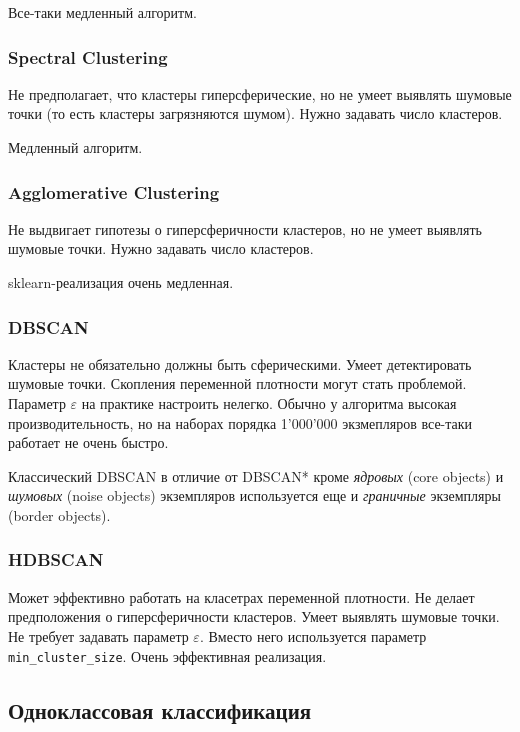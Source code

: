 \documentclass[%
	11pt,
	a4paper,
	utf8,
		]{article}
\begin{document}
Все-таки медленный алгоритм.

\subsubsection{Spectral Clustering}

Не предполагает, что кластеры гиперсферические, но не умеет выявлять шумовые точки (то есть кластеры загрязняются шумом). Нужно задавать число кластеров.

Медленный алгоритм.

\subsubsection{Agglomerative Clustering}

Не выдвигает гипотезы о гиперсферичности кластеров, но не умеет выявлять шумовые точки. Нужно задавать число кластеров.

sklearn-реализация очень медленная.

\subsubsection{DBSCAN}

Кластеры не обязательно должны быть сферическими. Умеет детектировать шумовые точки. Скопления переменной плотности могут стать проблемой. Параметр $ \varepsilon $ на практике настроить нелегко. Обычно у алгоритма высокая производительность, но на наборах порядка 1'000'000 экзмепляров все-таки работает не очень быстро.

Классический DBSCAN в отличие от DBSCAN* кроме \emph{ядровых} (core objects) и \emph{шумовых} (noise objects) экземпляров используется еще и \emph{граничные} экземпляры (border objects).

\subsubsection{HDBSCAN}

Может эффективно работать на класетрах переменной плотности. Не делает предположения о гиперсферичности кластеров. Умеет выявлять шумовые точки. Не требует задавать параметр $ \varepsilon $. Вместо него используется параметр \texttt{min\_cluster\_size}. Очень эффективная реализация.

\subsection{Одноклассовая классификация}
\end{document}
